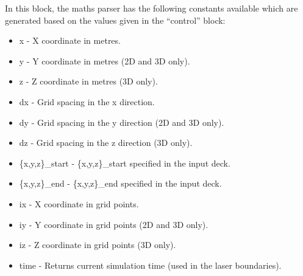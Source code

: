 \documentclass[12pt,a4paper]{article}
\begin{document}
In this block, the maths parser has the following constants available
which are generated based on the values given in the ``control'' block:
\begin{itemize}
\item x - X coordinate in metres.
\item y - Y coordinate in metres (2D and 3D only).
\item z - Z coordinate in metres (3D only).
\item dx - Grid spacing in the x direction.
\item dy - Grid spacing in the y direction (2D and 3D only).
\item dz - Grid spacing in the z direction (3D only).
\item \{x,y,z\}\_start - \{x,y,z\}\_start specified in the input deck.
\item \{x,y,z\}\_end - \{x,y,z\}\_end specified in the input deck.
\item ix - X coordinate in grid points.
\item iy - Y coordinate in grid points (2D and 3D only).
\item iz - Z coordinate in grid points (3D only).
\item time - Returns current simulation time (used in the laser boundaries).
\end{itemize}
\end{document}
